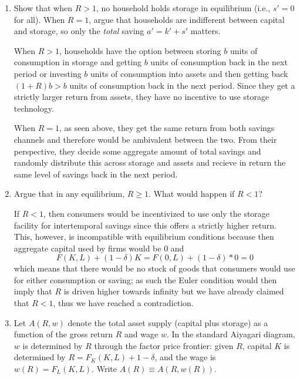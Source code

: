 \documentclass[11pt,english]{article}
\begin{document}
\begin{enumerate}
    \item[(g)] Show that when $R > 1$, no household holds storage in equilibrium
        (i.e., $s' = 0$ for all). When $R = 1$, argue that households are
        indifferent between capital and storage, so only the \textit{total}
        saving $a' = k' + s'$ matters.
    \begin{solution}
 When $R > 1$, households have the option between storing $b$ units of consumption in storage and getting $b$ units of consumption back in the next period or investing $b$ units of consumption into assets and then getting back $(1 + R)b > b$ units of consumption back in the next period. Since they get a strictly larger return from assets, they have no incentive to use storage technology.

When $R = 1$, as seen above, they get the same return from both savings channels and therefore would be ambivalent between the two. From their perspective, they decide some aggregate amount of total savings and randomly distribute this across storage and assets and recieve in return the same level of savings back in the next period. 
    \end{solution}
 
    \item[(h)] Argue that in any equilibrium, $R \geq 1$. What would happen if
        $R < 1$?
    \begin{solution}
 	If $R < 1$, then consumers would be incentivized to use only the storage facility for intertemporal savings since this offers a strictly higher return. This, however, is incompatible with equilibrium conditions because then aggregate capital used by firms would be $0$ and $$F(K, L) + (1 - \delta)K = F(0, L) + (1 - \delta)*0 = 0$$ which means that there would be no stock of goods that consumers would use for either consumption or saving; as such the Euler condition would then imply that $R$ is driven higher towards infinity but we have already claimed that $R < 1$, thus we have reached a contradiction.
    \end{solution}
 
    \item[(i)] Let $A(R, w)$ denote the total asset supply (capital plus storage)
        as a function of the gross return $R$ and wage $w$. In the standard
        Aiyagari diagram, $w$ is determined by $R$ through the factor price
        frontier: given $R$, capital $K$ is determined by $R = F_K(K, L) + 1 -
        \delta$, and the wage is $w(R) = F_L(K, L)$. Write $A(R) \equiv A(R,
        w(R))$.
 

\end{enumerate}
\end{document}
